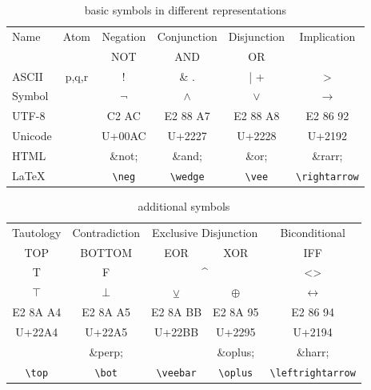 \begin{table}[htdp]
\begin{center}
\begin{tabular}{lccccc}
Name	& Atom 	& Negation		& Conjunction		& Disjunction		&  Implication \\
		&  		& NOT		& AND		& OR		&   \\
ASCII 	& p,q,r 	& ! 			& \& \quad .	& |  \quad +			&> 	\\
Symbol  	&		& $\neg$		& $\wedge$	& {$\vee$}		&$\rightarrow$ \\ 
UTF-8	&		& C2 AC		& E2 88 A7	& {E2 88 A8}	&E2 86 92\\
Unicode	&		& U+00AC 	& U+2227		& {U+2228}	&U+2192\\
HTML	&		& \&not;		& \&and;		& \&or;		& \&rarr;  \\
LaTeX	&		& \verb+\neg+	& \verb+\wedge+ & \verb+\vee+ & \verb+\rightarrow+ \\

\end{tabular}
\caption{basic symbols in different representations}
\end{center}
\label{tab:BASICSYMBOLS}
\end{table}%

\begin{table}[htdp]
\begin{center}
\begin{tabular}{ccccc}
Tautology		& Contradiction		& \multicolumn{2}{c}{Exclusive Disjunction}	& Biconditional \\	
TOP			& BOTTOM		& EOR & XOR							& IFF \\
T \quad 1		& F  \quad 0		& \multicolumn{2}{c}{\textasciicircum} 		& <> \\
$\top$		& $\bot$			& $\veebar$ 							&$\oplus$   			&$ \leftrightarrow$\\
E2 8A A4		& E2 8A A5		& E2 8A BB							& E2 8A 95			&E2 86 94\\
U+22A4		& U+22A5			& U+22BB							& U+2295				&U+2194\\
			& \&perp;			&									& \&oplus;				& \&harr;\\
\verb+\top+	& \verb+\bot+	& \verb+\veebar+ & \verb+\oplus+	& \verb+\leftrightarrow+
\end{tabular}
\caption{additional symbols}
\end{center}
\label{tab:ADDITIONALSYMBOLS}
\end{table}%


